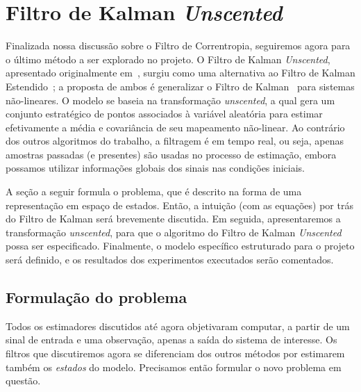 \chapter{Filtro de Kalman \textit{Unscented}}
\label{chapter:unscented}

Finalizada nossa discussão sobre o Filtro de Correntropia, seguiremos agora para o último método a ser explorado no projeto. O Filtro de Kalman \textit{Unscented}, apresentado originalmente em~\cite{julier-1997}, surgiu como uma alternativa ao Filtro de Kalman Estendido~\cite{sorenson-1985}; a proposta de ambos é generalizar o Filtro de Kalman~\cite{hayes-1996} para sistemas não-lineares. O modelo se baseia na transformação \textit{unscented}, a qual gera um conjunto estratégico de pontos associados 
à variável aleatória para estimar efetivamente a média e covariância de seu mapeamento não-linear. Ao contrário dos outros algoritmos do trabalho, a filtragem é em tempo real, ou seja, apenas amostras passadas (e presentes) são usadas no processo de estimação, embora possamos utilizar informações globais dos sinais nas condições iniciais.

A seção a seguir formula o problema, que é descrito na forma de uma representação em espaço de estados. Então, a intuição (com as equações) por trás do Filtro de Kalman será brevemente discutida. Em seguida, apresentaremos a transformação \textit{unscented}, para que o algoritmo do Filtro de Kalman \textit{Unscented} possa ser especificado. Finalmente, o modelo específico estruturado para o projeto será definido, e os resultados dos experimentos executados serão comentados.

\section{Formulação do problema}
\label{section:unscented:formulation}

Todos os estimadores discutidos até agora objetivaram computar, a partir de um sinal de entrada e uma observação, apenas a saída do sistema de interesse. Os filtros que discutiremos agora se diferenciam dos outros métodos por estimarem também os \emph{estados} do modelo. Precisamos então formular o novo problema em questão.

